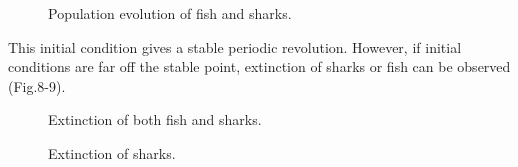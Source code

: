 \documentclass[aps,prl,preprint,superscriptaddress]{revtex4}
\begin{document}
\begin{figure}[H]
	\centering
	\caption{Population evolution of fish and sharks.}
	\label{more_clusters} 
\end{figure}

This initial condition gives a stable periodic revolution. However, if initial conditions are far off the stable point, extinction of sharks or fish can be observed (Fig.8-9).


\begin{figure}[H]
	\centering
	\caption{Extinction of both fish and sharks.}
	\label{more_clusters} 
\end{figure}

\begin{figure}[H]
	\centering
	\caption{Extinction of sharks.}
	\label{more_clusters} 
\end{figure}
 
  
\end{document}
